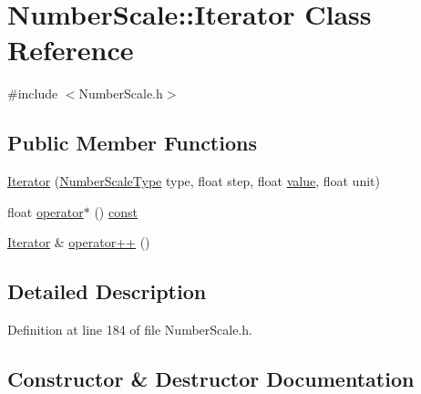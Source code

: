 \hypertarget{class_number_scale_1_1_iterator}{}\section{Number\+Scale\+:\+:Iterator Class Reference}
\label{class_number_scale_1_1_iterator}


{\ttfamily \#include $<$Number\+Scale.\+h$>$}

\subsection*{Public Member Functions}
\begin{DoxyCompactItemize}
\item 
\hyperlink{class_number_scale_1_1_iterator_a97771fd600b220d2a9f2b5f2e36d2863}{Iterator} (\hyperlink{_number_scale_8h_a29bce02ed76d27dfa11771d3200a2bd2}{Number\+Scale\+Type} type, float step, float \hyperlink{lib_2expat_8h_a4a30a13b813682e68c5b689b45c65971}{value}, float unit)
\item 
float \hyperlink{class_number_scale_1_1_iterator_a7c0f9caf33d380dc917d40c4fed1d2dc}{operator$\ast$} () \hyperlink{getopt1_8c_a2c212835823e3c54a8ab6d95c652660e}{const} 
\item 
\hyperlink{class_number_scale_1_1_iterator}{Iterator} \& \hyperlink{class_number_scale_1_1_iterator_ae8a25eed95253acebb34af6ae7a094f6}{operator++} ()
\end{DoxyCompactItemize}


\subsection{Detailed Description}


Definition at line 184 of file Number\+Scale.\+h.



\subsection{Constructor \& Destructor Documentation}
